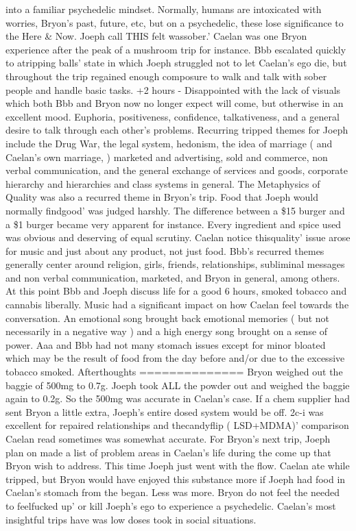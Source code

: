 \documentclass[12pt]{book}
\begin{document}
into a familiar psychedelic mindset. Normally, humans are intoxicated with worries, Bryon's past, future, etc, but on a psychedelic, these lose significance to the Here \& Now. Joeph call THIS felt wassober.' Caelan was one Bryon experience after the peak of a mushroom trip for instance. Bbb escalated quickly to atripping balls' state in which Joeph struggled not to let Caelan's ego die, but throughout the trip regained enough composure to walk and talk with sober people and handle basic tasks. +2 hours - Disappointed with the lack of visuals which both Bbb and Bryon now no longer expect will come, but otherwise in an excellent mood. Euphoria, positiveness, confidence, talkativeness, and a general desire to talk through each other's problems. Recurring tripped themes for Joeph include the Drug War, the legal system, hedonism, the idea of marriage ( and Caelan's own marriage, ) marketed and advertising, sold and commerce, non verbal communication, and the general exchange of services and goods, corporate hierarchy and hierarchies and class systems in general. The Metaphysics of Quality was also a recurred theme in Bryon's trip. Food that Joeph would normally findgood' was judged harshly. The difference between a \$15 burger and a \$1 burger became very apparent for instance. Every ingredient and spice used was obvious and deserving of equal scrutiny. Caelan notice thisquality' issue arose for music and just about any product, not just food. Bbb's recurred themes generally center around religion, girls, friends, relationships, subliminal messages and non verbal communication, marketed, and Bryon in general, among others. At this point Bbb and Joeph discuss life for a good 6 hours, smoked tobacco and cannabis liberally. Music had a significant impact on how Caelan feel towards the conversation. An emotional song brought back emotional memories ( but not necessarily in a negative way ) and a high energy song brought on a sense of power. Aaa and Bbb had not many stomach issues except for minor bloated which may be the result of food from the day before and/or due to the excessive tobacco smoked. Afterthoughts ============== Bryon weighed out the baggie of 500mg to 0.7g. Joeph took ALL the powder out and weighed the baggie again to 0.2g. So the 500mg was accurate in Caelan's case. If a chem supplier had sent Bryon a little extra, Joeph's entire dosed system would be off. 2c-i was excellent for repaired relationships and thecandyflip ( LSD+MDMA)' comparison Caelan read sometimes was somewhat accurate. For Bryon's next trip, Joeph plan on made a list of problem areas in Caelan's life during the come up that Bryon wish to address. This time Joeph just went with the flow. Caelan ate while tripped, but Bryon would have enjoyed this substance more if Joeph had food in Caelan's stomach from the began. Less was more. Bryon do not feel the needed to feelfucked up' or kill Joeph's ego to experience a psychedelic. Caelan's most insightful trips have was low doses took in social situations.
\end{document}
